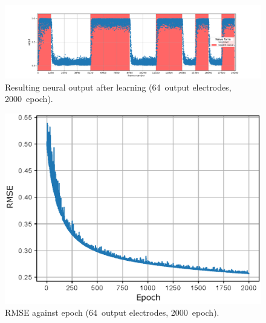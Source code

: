 \documentclass[a4j, twocolumn]{jsarticle}
\begin{document}
\begin{figure}
\centering
\includegraphics[width=1\hsize]{./figures/b128_e2000_eta30_nn64_r} 
\caption{Resulting neural output after learning (64~output electrodes, 2000~epoch).}
\label{fig:result64}
\end{figure}

\begin{figure}
\centering
\includegraphics[width=1\hsize]{./figures/rmse_curvesinsqr128_32i_l_hilsinsqr128_32i_l2_hil_num_neuron64_ramdomselected_timesequence_epoch2000_batchsize128_mask10_eta30_transition0_loopnum9_r} 
\caption{RMSE against epoch (64~output electrodes, 2000~epoch).}
\label{fig:lc64}
\end{figure}
\end{document}
